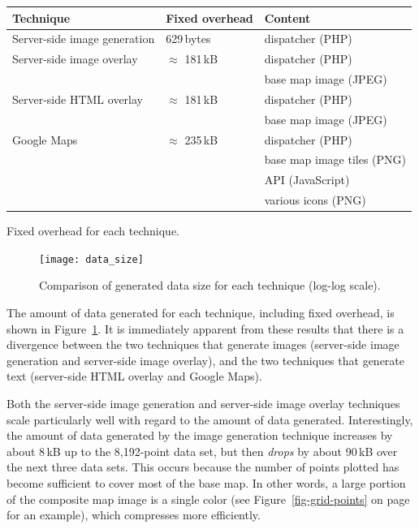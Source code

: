 \documentclass[acmnow]{acmtrans2m}
\begin{document}
\begin{acmtable}{11cm}
	\centering
	\begin{tabular}{lll}
		Technique						&	Fixed overhead		&	Content	\\
		\hline
		Server-side image generation	&	629\,bytes			&	dispatcher (PHP)\smallskip	\\

		Server-side image overlay		&	\(\approx\) 181\,kB	&	dispatcher (PHP) \\
										&						&	base map image (JPEG)\smallskip	\\

		Server-side HTML overlay		&	\(\approx\) 181\,kB	&	dispatcher (PHP) \\
										&						&	base map image (JPEG)\smallskip	\\

		Google Maps						&	\(\approx\) 235\,kB	&	dispatcher (PHP) \\
										&						&	base map image tiles (PNG) \\
										&						&	API (JavaScript) \\
										&						&	various icons (PNG)	\\
	\end{tabular}
	\caption{Fixed overhead for each technique.}
	\label{tab-overhead}
\end{acmtable}


\begin{figure}
	\centering
	\texttt{[image: data\_size]}
	\caption{Comparison of generated data size for each technique (log-log scale).}
	\label{fig-data-size}
\end{figure}


The amount of data generated for each technique, including fixed
overhead, is shown in Figure~\ref{fig-data-size}. It is immediately
apparent from these results that there is a divergence between the two
techniques that generate images (server-side image generation and
server-side image overlay), and the two techniques that generate text
(server-side HTML overlay and Google Maps).

Both the server-side image generation and server-side image overlay
techniques scale particularly well with regard to the amount of data
generated. Interestingly, the amount of data generated by the image
generation technique increases by about 8\,kB up to the 8,192-point data
set, but then \emph{drops} by about 90\,kB over the next three data
sets. This occurs because the number of points plotted has become
sufficient to cover most of the base map. In other words, a large
portion of the composite map image is a single color (see
Figure~\ref{fig-grid-points} on page~\pageref{fig-grid-points} for an
example), which compresses more efficiently.
\end{document}
